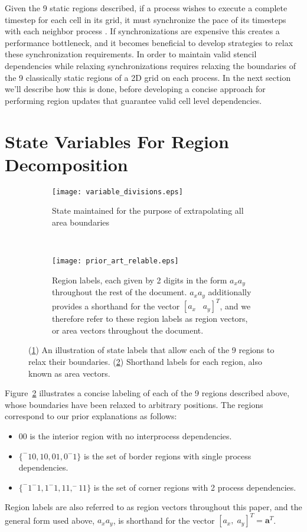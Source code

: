 Given the 9 static regions described, if a process wishes to execute a complete
timestep for each cell in its grid, it must synchronize the pace of its timesteps
with each neighbor process .
If synchronizations are expensive this creates a performance bottleneck, and
it becomes beneficial
to develop strategies to relax these synchronization requirements.
In order to maintain
valid stencil dependencies while relaxing synchronizations
requires relaxing the boundaries of the 9 classically
static regions of a 2D grid
on each process.  In the next section we'll describe how this is done, before
developing a concise approach for performing region updates
that guarantee valid cell level dependencies.
ْ
\section{State Variables For Region Decomposition}\label{sec:state}

\begin{figure}[t]
  \centering
  \begin{subfigure}[t]{.5\textwidth}
    \centering
    \texttt{[image: variable\_divisions.eps]}
    \caption{State maintained for the purpose of extrapolating all area boundaries}
    \label{fig:state_labels}
  \end{subfigure}
  ~
  \begin{subfigure}[t]{.4\textwidth}
    \centering
    \texttt{[image: prior\_art\_relable.eps]}
    \caption{Region labels, each given by 2 digits in the form $a_xa_y$ throughout the rest of the document.
    $a_xa_y$ additionally provides a shorthand for the vector $[a_x\;\;\; a_y]^T$, and we therefore refer to
    these region labels as region vectors, or area vectors throughout the document.}\label{fig:region_vectors}
    \end{subfigure}
  \caption{(\ref{fig:state_labels}) An illustration of state labels that allow each of the 9 regions to relax their
  boundaries.  (\ref{fig:region_vectors}) Shorthand labels for each region, also known as area vectors.}
  \label{fig:local_decomposition}
\end{figure}

Figure~\ref{fig:region_vectors} illustrates a concise labeling of
each of the 9 regions described above, whose boundaries have been
relaxed to arbitrary positions.  The regions correspond to our
prior explanations as follows:
\begin{itemize}
  \item $00$ is the interior region with no interprocess dependencies.
  \item $\{^-10,10,01,0^-1 \}$ is the set of border regions with single process dependencies.
  \item $\{^-1^-1,1^-1,11,^-11 \}$ is the set of corner regions with 2 process dependencies.
\end{itemize}
Region labels are also referred to as region vectors throughout this
paper, and the general form used above, $a_xa_y$, is
shorthand for the vector $[a_x,\; a_y]^T = \mathbf{a}^T$.

